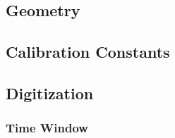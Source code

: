 \section{}


\subsection{Geometry}

\subsection{Calibration Constants}


\subsection{Digitization}

\subsubsection{Time Window}


